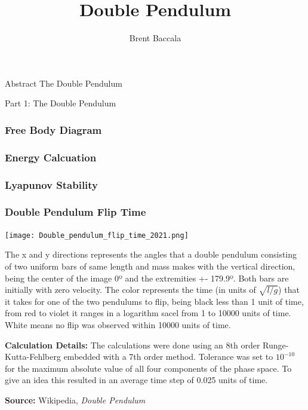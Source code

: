 \documentclass{beamer}
\title{Double Pendulum}
\author{Brent Baccala}
\institute{\tt cosine@freesoft.org}
\begin{document}
\begin{frame}
\titlepage
\begin{block}{Abstract}
The Double Pendulum
\end{block}
\end{frame}

\begin{frame}
\begin{exampleblock}{}
\begin{center}
\vskip 20pt
\Huge
Part 1: The Double Pendulum
\vskip 6pt
\ 
\end{center}
\end{exampleblock}
\end{frame}

\begin{frame}
\frametitle{Free Body Diagram}
\end{frame}

\begin{frame}
\frametitle{Energy Calcuation}
\end{frame}

\begin{frame}
\frametitle{Lyapunov Stability}
\end{frame}

\begin{frame}
\frametitle{Double Pendulum Flip Time}
\begin{center}
\vskip -0.1in
\texttt{[image: Double\_pendulum\_flip\_time\_2021.png]}
\end{center}

\tiny
The x and y directions represents the angles that a double pendulum consisting of two uniform bars of same length and mass makes with the vertical direction, being the center of the image 0º and the extremities +- 179.9º. Both bars are initially with zero velocity. The color represents the time (in units of $\sqrt {l/g}$) that it takes for one of the two pendulums to flip, being black less than 1 unit of time, from red to violet it ranges in a logarithm sacel from 1 to 10000 units of time. White means no flip was observed within 10000 units of time.

{\bf Calculation Details:}
The calculations were done using an 8th order Runge-Kutta-Fehlberg embedded with a 7th order method. Tolerance was set to $10^{-10}$ for the maximum absolute value of all four components of the phase space. To give an idea this resulted in an average time step of 0.025 units of time.

{\bf Source:} Wikipedia, {\it Double Pendulum}

\end{frame}
\end{document}
